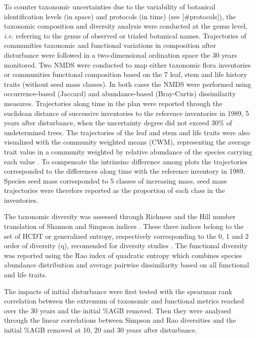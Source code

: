 \documentclass[fleqn,10pt]{ArtEcoFoG} %
\theoremstyle{definition}
\theoremstyle{definition}
\theoremstyle{definition}
\theoremstyle{remark}
\begin{document}
To counter taxonomic uncertainties due to the variability of botanical
identification levels (in space) and protocols (in time) (see {[}\#protocols{]}), the taxonomic
composition and diversity analysis were conducted at the genus level,
\emph{i.e.} referring to the genus of observed or trialed botanical
names. Trajectories of communities taxonomic and functional variations
in composition after disturbance were followed in a two-dimensional
ordination space the 30 years monitored. Two NMDS were conducted to map
either taxonomic flora inventories or communities functional composition
based on the 7 leaf, stem and life history traits (without seed mass
classes). In both cases the NMDS were performed using occurrence-based
(Jaccard) and abundance-based (Bray-Curtis) dissimilarity measures.
Trajectories along time in the plan were reported through the euclidean
distance of successive inventories to the reference inventories in 1989,
5 years after disturbance, when the uncertainty degree did not exceed
30\% of undetermined trees. The trajectories of the leaf and stem and
life traits were also visualized with the community weighted means
(CWM), representing the average trait value in a community weighted by
relative abundance of the species carrying each value
\citep{Diaz2007, Garnier2004}. To compensate the intrinsinc difference
among plots the trajectories corresponded to the differences along time
with the reference inventory in 1989. Species seed mass corresponded to
5 classes of increasing mass, seed mass trajectories were therefore
reported as the proportion of each class in the inventories.

The taxonomic diversity was assessed through Richness and the Hill
number translation of Shannon and Simpson indices \citep{Hill1973}.
These three indices belong to the set of HCDT or generalized entropy,
respectively corresponding to the 0, 1 and 2 order of diversity (q),
recomended for diversity studies \citep{Patil1982, Tothmeresz1995}. The
functional diversity was reported using the Rao index of quadratic
entropy which combines species abundance distribution and average
pairwise dissimilarity based on all functional and life traits.

The impacts of initial disturbance were first tested with the spearman
rank correlation between the extremum of taxonomic and functional
metrics reached over the 30 years and the initial \%AGB removed. Then
they were analysed through the linear correlations between Simpson and
Rao diversities and the initial \%AGB removed at 10, 20 and 30 years
after disturbance.
\end{document}
